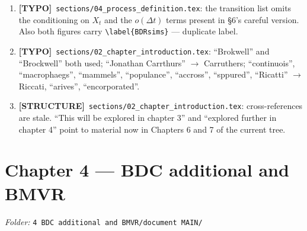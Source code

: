 \documentclass[11pt]{article}
\newcommand{\xt}{X_t}
\theoremstyle{plain}
\theoremstyle{definition}
\theoremstyle{remark}
\newcommand{\TYP}{\textcolor{gray!80!black}{\textbf{[TYPO]}}}
\newcommand{\STR}{\textcolor{purple!70!black}{\textbf{[STRUCTURE]}}}
\begin{document}
\begin{enumerate}[leftmargin=2.2em,label=\textbf{3.\arabic*}]
\item \TYP\ \texttt{sections/04\_process\_definition.tex}: the transition list omits the
conditioning on $\xt$ and the $o(\Delta t)$ terms present in \S6's careful version.
Also both figures carry \verb|\label{BDRsims}| --- duplicate label.

\item \TYP\ \texttt{sections/02\_chapter\_introduction.tex}: ``Brokwell'' and
``Brockwell'' both used; ``Jonathan Carrthurs'' $\to$ Carruthers; ``continuois'',
``macrophaegs'', ``mammels'', ``populance'', ``accross'', ``sppured'', ``Ricatti'' $\to$
Riccati, ``arives'', ``encorporated''.

\item \STR\ \texttt{sections/02\_chapter\_introduction.tex}: cross-references are stale.
``This will be explored in chapter 3'' and ``explored further in chapter 4'' point to
material now in Chapters 6 and 7 of the current tree.
\end{enumerate}

\section{Chapter 4 --- BDC additional and BMVR}
\emph{Folder:} \texttt{4 BDC additional and BMVR/document MAIN/}
\end{document}
